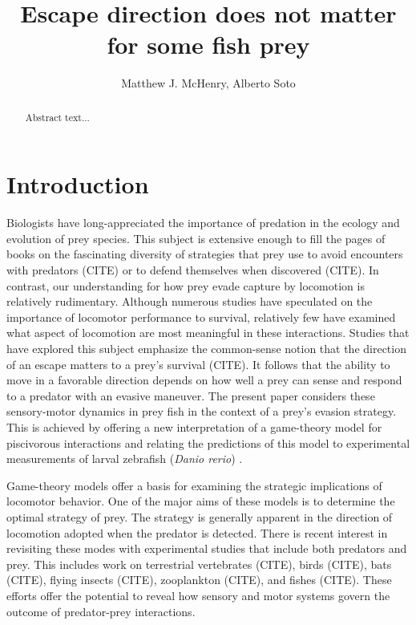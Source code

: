 \documentclass[12pt]{article}
\title{Escape direction does not matter for some fish prey}
\author{Matthew J. McHenry, Alberto Soto}
\begin{document}

\maketitle

\pagebreak


\begin{abstract}

Abstract text...

\end{abstract}

\pagebreak


\section{Introduction}


Biologists have long-appreciated the importance of predation in the ecology and evolution of prey species. This subject is extensive enough to fill the pages of books on the fascinating diversity of strategies that prey use to avoid encounters with predators (CITE) or to defend themselves when discovered (CITE). In contrast, our understanding for how prey evade capture by locomotion is relatively rudimentary. Although numerous studies have speculated on the importance of locomotor performance to survival, relatively few have examined what aspect of locomotion are most meaningful in these interactions. Studies that have explored this subject emphasize the common-sense notion that the direction of an escape matters to a prey's survival (CITE). It follows that the ability to move in a favorable direction depends on how well a prey can sense and respond to a predator with an evasive maneuver. The present paper considers these sensory-motor dynamics in prey fish in the context of a prey's evasion strategy. This is achieved by offering a new interpretation of a game-theory model for piscivorous interactions \citep{Weihs:1984tb} and relating the predictions of this model to experimental measurements of larval zebrafish (\textit{Danio rerio}) \citep{Stewart:2014cm}.

Game-theory models offer a basis for examining the strategic implications of locomotor behavior. One of the major aims of these models is to determine the optimal strategy of prey. The strategy is generally apparent in the direction of locomotion adopted when the predator is detected. There is recent interest in revisiting these modes with experimental studies that include both predators and prey. This includes work on terrestrial vertebrates (CITE), birds (CITE), bats (CITE), flying insects (CITE), zooplankton (CITE), and fishes (CITE). These efforts offer the potential to reveal how sensory and motor systems govern the outcome of predator-prey interactions. 
\end{document}
